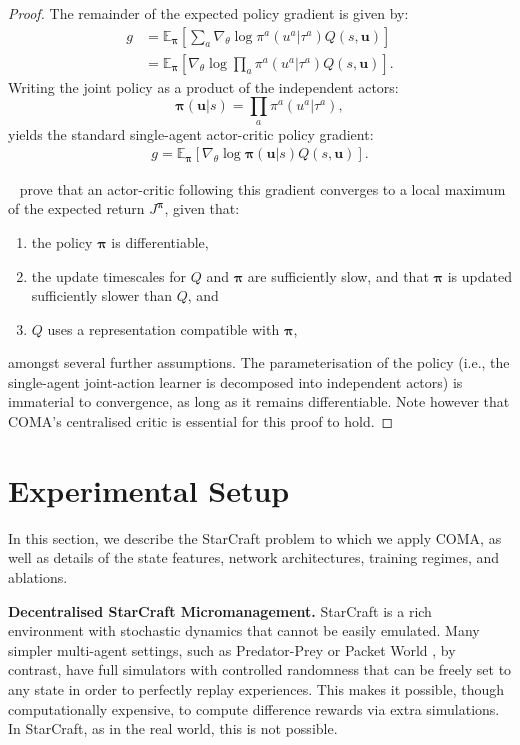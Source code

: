 \documentclass[letterpaper]{article}
\newcommand{\citet}[1]{\citeauthor{#1}~\shortcite{#1}}
\newcommand{\citep}{\cite}
\newcommand{\myvec}[1]{\mathbf{#1}}
\newcommand{\myvecsym}[1]{\boldsymbol{#1}}
\newcommand{\vpi}{\myvecsym{\pi}}
\newcommand{\vu}{\myvec{u}}
\newcommand{\E}{\mathbb{E}}
\begin{document}
\begin{proof}
The remainder of the expected policy gradient is given by:
\begin{align}
g &= \E_{\vpi} \left[ \sum_a \nabla_\theta \log
\pi^a(u^a | \tau^a)
Q(s,\vu) \right] \\
&= \E_{\vpi} \left[ \nabla_\theta \log \prod_a 
\pi^a(u^a | \tau^a)
Q(s,\vu) \right].
\end{align}
Writing the joint policy as a product of the independent actors:
\begin{equation}
\vpi(\vu|s) = \prod_a \pi^a(u^a | \tau^a),
\end{equation}
yields the standard single-agent actor-critic policy gradient:
\begin{align}
g = \E_{\vpi} \left[ \nabla_\theta \log \vpi(\vu|s) 
Q(s,\vu) \right].
\end{align}

\citet{konda2000actor} prove that an actor-critic 
following this gradient converges to a local maximum of the expected return 
$J^{\vpi}$, given that:
\begin{enumerate}
	\item the policy $\vpi$ is differentiable,
	\item the update timescales for $Q$ and $\vpi$ are sufficiently slow, and 
	that 
	$\vpi$ is updated sufficiently slower than $Q$, and
	\item $Q$ uses a representation compatible with $\vpi$,
\end{enumerate}
amongst several further assumptions. The parameterisation of the 
policy (i.e., the single-agent joint-action learner is decomposed into 
independent actors) is immaterial to convergence, as long as it remains 
differentiable. Note however that COMA's centralised critic is essential for 
this proof to hold.
\end{proof}

\section{Experimental Setup}
\label{sec:setting}

In this section, we describe the StarCraft problem to which we apply COMA, as
well as details of the state features, network architectures, training regimes,
and ablations.

\textbf{Decentralised StarCraft Micromanagement.} StarCraft is a rich
environment with stochastic dynamics that cannot be easily emulated. Many
simpler multi-agent settings, such as Predator-Prey \citep{tan1993multi} or
Packet World \citep{weyns2005packet}, by contrast, have full simulators with
controlled randomness that can be freely set to any state in order to perfectly
replay experiences. This makes it possible, though computationally expensive, to
compute difference rewards via extra simulations. In StarCraft, as in the real
world, this is not possible.
\end{document}
